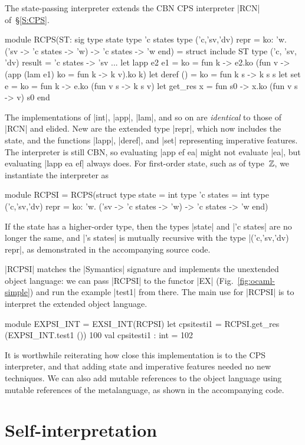 The state-passing interpreter extends the CBN CPS
interpreter |RCN| of~\S\ref{S:CPS}.
\begin{code}
module RCPS(ST: sig 
  type state 
  type 'c states 
  type ('c,'sv,'dv) repr = 
      {ko: 'w. ('sv -> 'c states -> 'w) -> 'c states -> 'w}
end) = struct
  include ST
  type ('c, 'sv, 'dv) result = 'c states -> 'sv
  ... 
  let lapp e2 e1 = {ko = fun k ->
      e2.ko (fun v -> (app (lam e1) {ko = fun k -> k v}).ko k)}
  let deref () = {ko = fun k s -> k s s}
  let set e = {ko = fun k -> e.ko (fun v s -> k s v)}
  let get_res x = fun s0 -> x.ko (fun v s -> v) s0
end
\end{code}
The implementations of |int|, |app|, |lam|, and so on are
\emph{identical} to those of |RCN| and elided. New are the extended type
|repr|,
which now includes the state, and the functions
|lapp|, |deref|, and |set| representing imperative features. The
interpreter is still CBN, so evaluating |app ef ea| might not
evaluate |ea|, but evaluating |lapp ea ef| always does.
For first-order state, such as of type~$\mathbb{Z}$, we 
instantiate the interpreter as
\begin{code}
module RCPSI = RCPS(struct 
  type state = int
  type 'c states = int
  type ('c,'sv,'dv) repr = 
      {ko: 'w. ('sv -> 'c states -> 'w) -> 'c states -> 'w}
end)
\end{code}
If the state has a higher-order type, then the types |state| and |'c states|
are no longer the same, and |'s states| is mutually
recursive with the type |('c,'sv,'dv) repr|, as demonstrated in the
accompanying source code.

|RCPSI| matches the |Symantics| signature and implements the
unextended object language: we can pass |RCPSI|
to the functor |EX| (Fig.~\ref{fig:ocaml-simple}) and run 
the example |test1| from there. The main use for |RCPSI| is to interpret the 
extended object language.
\begin{code}
module EXPSI_INT = EXSI_INT(RCPSI)
let cpsitesti1 = RCPSI.get_res (EXPSI_INT.test1 ()) 100
val cpsitesti1 : int = 102
\end{code}

It is worthwhile reiterating how close this implementation is to the CPS
interpreter, and that adding state and imperative features needed no new
techniques.
We can also add mutable references to the object language using
mutable references of the metalanguage, as shown in the accompanying
code.
\fi
\fi

\ifshort\else
\section{Self-interpretation}\label{selfinterp}

